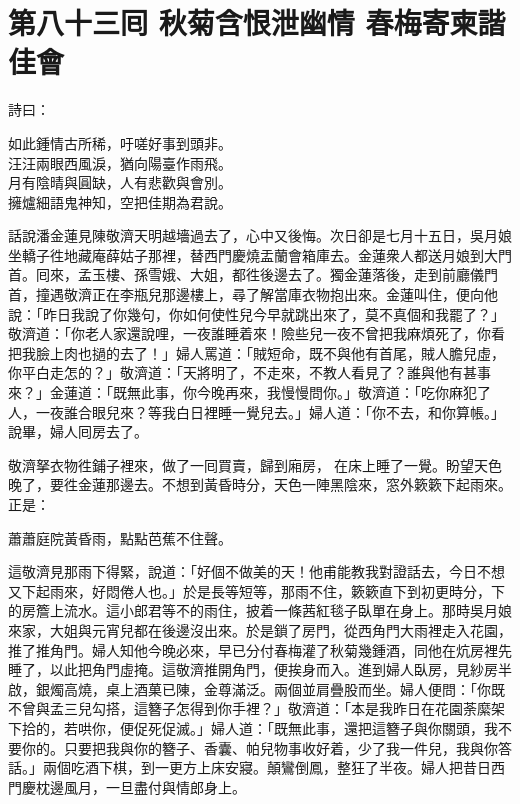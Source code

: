 
\chapter*{第八十三囘 秋菊含恨泄幽情 春梅寄柬諧佳會}


詩曰：

\begin{myquote}
如此鍾情古所稀，吁嗟好事到頭非。\\汪汪兩眼西風淚，猶向陽臺作雨飛。\\月有陰晴與圓缺，人有悲歡與會別。\\擁爐細語鬼神知，空把佳期為君說。
\end{myquote}

話說潘金蓮見陳敬濟天明越墻過去了，心中又後悔。{}次日卻是七月十五日，吳月娘坐轎子徃地藏庵薛姑子那裡，替西門慶燒盂蘭會箱庫去。金蓮衆人都送月娘到大門首。囘來，孟玉樓、孫雪娥、大姐，都徃後邊去了。獨金蓮落後，走到前廳儀門首，撞遇敬濟正在李瓶兒那邊樓上，尋了解當庫衣物抱出來。金蓮叫住，便向他說：「昨日我說了你幾句，你如何使性兒今早就跳出來了，莫不真個和我罷了？」敬濟道：「你老人家還說哩，一夜誰睡着來！險些兒一夜不曾把我麻煩死了，你看把我臉上肉也撾的去了！」婦人罵道：「賊短命，既不與他有首尾，賊人膽兒虛，你平白走怎的？」{}敬濟道：「天將明了，不走來，不教人看見了？誰與他有甚事來？」金蓮道：「既無此事，你今晚再來，我慢慢問你。」敬濟道：「吃你麻犯了人，一夜誰合眼兒來？等我白日裡睡一覺兒去。」婦人道：「你不去，和你算帳。」{}說畢，婦人囘房去了。

敬濟拏衣物徃鋪子裡來，做了一囘買賣，歸到廂房，𢱉在床上睡了一覺。盼望天色晚了，要徃金蓮那邊去。不想到黃昏時分，天色一陣黑陰來，窓外簌簌下起雨來。{}正是：

\begin{myquote}
蕭蕭庭院黃昏雨，點點芭蕉不住聲。
\end{myquote}

這敬濟見那雨下得緊，說道：「好個不做美的天！他甫能教我對證話去，今日不想又下起雨來，好悶倦人也。」於是長等短等，那雨不住，簌簌直下到初更時分，下的房簷上流水。這小郎君等不的雨住，披着一條茜紅毯子臥單在身上。{}那時吳月娘來家，大姐與元宵兒都在後邊沒出來。於是鎖了房門，從西角門大雨裡走入花園，推了推角門。婦人知他今晚必來，早已分付春梅灌了秋菊幾鍾酒，同他在炕房裡先睡了，以此把角門虛掩。這敬濟推開角門，便挨身而入。進到婦人臥房，見紗房半啟，銀燭高燒，桌上酒菓已陳，金尊滿泛。兩個並肩疊股而坐。婦人便問：「你既不曾與孟三兒勾搭，這簪子怎得到你手裡？」敬濟道：「本是我昨日在花園荼縻架下拾的，若哄你，便促死促滅。」婦人道：「既無此事，還把這簪子與你關頭，{}我不要你的。只要把我與你的簪子、香囊、帕兒物事收好着，少了我一件兒，我與你答話。」兩個吃酒下棋，到一更方上床安寢。顛鸞倒鳳，整狂了半夜。婦人把昔日西門慶枕邊風月，一旦盡付與情郎身上。

